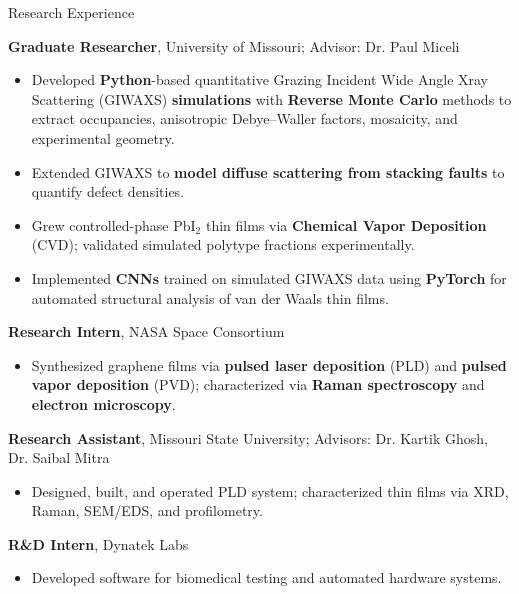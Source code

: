 \begin{rubric}{Research Experience}

    \entry*[2021--Present]%
    \textbf{Graduate Researcher}, University of Missouri; Advisor: Dr. Paul Miceli
    \begin{itemize}
        \item Developed \textbf{Python}-based quantitative Grazing Incident Wide Angle Xray Scattering (GIWAXS) \textbf{simulations} with \textbf{Reverse Monte Carlo} methods to extract occupancies, anisotropic Debye--Waller factors, mosaicity, and experimental geometry.
        \item Extended GIWAXS to \textbf{model diffuse scattering from stacking faults} to quantify defect densities.
        \item Grew controlled-phase PbI$_2$ thin films via \textbf{Chemical Vapor Deposition} (CVD); validated simulated polytype fractions experimentally.
        \item Implemented \textbf{CNNs} trained on simulated GIWAXS data using \textbf{PyTorch} for automated structural analysis of van der Waals thin films.
    \end{itemize}

    \entry*[2019--2020]%
    \textbf{Research Intern}, NASA Space Consortium
    \begin{itemize}
        \item Synthesized graphene films via \textbf{pulsed laser deposition} (PLD) and \textbf{pulsed vapor deposition} (PVD); characterized via \textbf{Raman spectroscopy} and \textbf{electron microscopy}.
    \end{itemize}

    \entry*[2017--2020]%
    \textbf{Research Assistant}, Missouri State University; Advisors: Dr. Kartik Ghosh, Dr. Saibal Mitra
    \begin{itemize}
        \item Designed, built, and operated PLD system; characterized thin films via XRD, Raman, SEM/EDS, and profilometry.
    \end{itemize}

    \entry*[2019]%
    \textbf{R\&D Intern}, Dynatek Labs
    \begin{itemize}
        \item Developed software for biomedical testing and automated hardware systems.
    \end{itemize}

\end{rubric}

